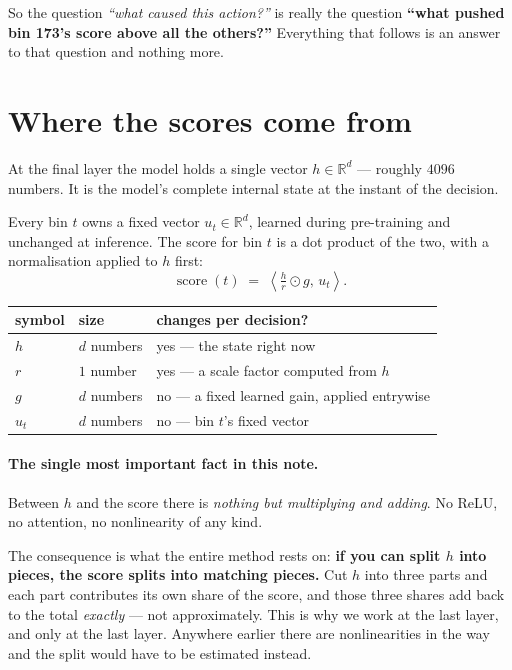 \documentclass[11pt]{article}
\newcommand{\Rb}{\mathbb{R}}
\newcommand{\dotp}[2]{\left\langle #1,\, #2 \right\rangle}
\begin{document}
So the question \emph{``what caused this action?''} is really the question \textbf{``what
pushed bin 173's score above all the others?''} Everything that follows is an answer to that
question and nothing more.

\section{Where the scores come from}
\label{sec:scores}

At the final layer the model holds a single vector $h \in \Rb^{d}$ --- roughly $4096$ numbers.
It is the model's complete internal state at the instant of the decision.

Every bin $t$ owns a fixed vector $u_t \in \Rb^{d}$, learned during pre-training and unchanged
at inference. The score for bin $t$ is a dot product of the two, with a normalisation applied
to $h$ first:
\begin{equation}
\operatorname{score}(t) \;=\; \dotp{\tfrac{h}{r} \odot g}{u_t}.
\label{eq:score}
\end{equation}

\begin{center}
\begin{tabular}{@{}lll@{}}
\toprule
symbol & size & changes per decision? \\
\midrule
$h$   & $d$ numbers & yes --- the state right now \\
$r$   & $1$ number  & yes --- a scale factor computed from $h$ \\
$g$   & $d$ numbers & no --- a fixed learned gain, applied entrywise \\
$u_t$ & $d$ numbers & no --- bin $t$'s fixed vector \\
\bottomrule
\end{tabular}
\end{center}

\paragraph{The single most important fact in this note.} Between $h$ and the score there is
\emph{nothing but multiplying and adding}. No ReLU, no attention, no nonlinearity of any kind.

The consequence is what the entire method rests on: \textbf{if you can split $h$ into pieces,
the score splits into matching pieces.} Cut $h$ into three parts and each part contributes its
own share of the score, and those three shares add back to the total \emph{exactly} --- not
approximately. This is why we work at the last layer, and only at the last layer. Anywhere
earlier there are nonlinearities in the way and the split would have to be estimated instead.
\end{document}

